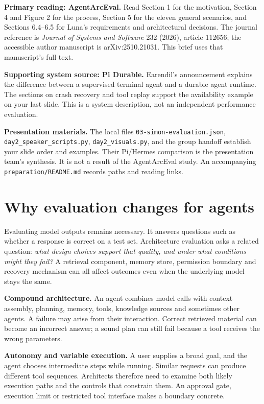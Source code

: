 \documentclass[11pt,a4paper]{article}
\begin{document}
\textbf{Primary reading: AgentArcEval.} Read Section 1 for the motivation, Section 4 and Figure 2 for the process, Section 5 for the eleven general scenarios, and Sections 6.4--6.5 for Luna's requirements and architectural decisions. The journal reference is \emph{Journal of Systems and Software} 232 (2026), article 112656; the accessible author manuscript is arXiv:2510.21031. This brief uses that manuscript's full text.\ \cite{arceval}

\textbf{Supporting system source: Pi Durable.} Earendil's announcement explains the difference between a supervised terminal agent and a durable agent runtime. The sections on crash recovery and tool replay support the availability example on your last slide. This is a system description, not an independent performance evaluation.\ \cite{durable}

\textbf{Presentation materials.} The local files \nolinkurl{03-simon-evaluation.json}, \nolinkurl{day2_speaker_scripts.py}, \nolinkurl{day2_visuals.py}, and the group handoff establish your slide order and examples. Their Pi/Hermes comparison is the presentation team's synthesis. It is not a result of the AgentArcEval study. An accompanying \texttt{preparation/README.md} records paths and reading links.

\section{Why evaluation changes for agents}
Evaluating model outputs remains necessary. It answers questions such as whether a response is correct on a test set. Architecture evaluation asks a related question: \emph{what design choices support that quality, and under what conditions might they fail?} A retrieval component, memory store, permission boundary and recovery mechanism can all affect outcomes even when the underlying model stays the same.

\textbf{Compound architecture.} An agent combines model calls with context assembly, planning, memory, tools, knowledge sources and sometimes other agents. A failure may arise from their interaction. Correct retrieved material can become an incorrect answer; a sound plan can still fail because a tool receives the wrong parameters.

\textbf{Autonomy and variable execution.} A user supplies a broad goal, and the agent chooses intermediate steps while running. Similar requests can produce different tool sequences. Architects therefore need to examine both likely execution paths and the controls that constrain them. An approval gate, execution limit or restricted tool interface makes a boundary concrete.
\end{document}
